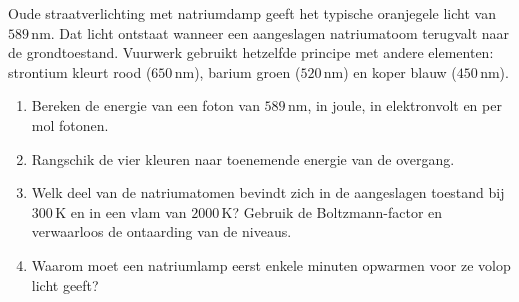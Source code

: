 \begin{oefening}
Oude straatverlichting met natriumdamp geeft het typische oranjegele licht van \(589\,\mathrm{nm}\). Dat licht ontstaat wanneer een aangeslagen natriumatoom terugvalt naar de grondtoestand. Vuurwerk gebruikt hetzelfde principe met andere elementen: strontium kleurt rood (\(650\,\mathrm{nm}\)), barium groen (\(520\,\mathrm{nm}\)) en koper blauw (\(450\,\mathrm{nm}\)).

\begin{enumerate}
\item[(a)]
  Bereken de energie van een foton van \(589\,\mathrm{nm}\), in joule, in elektronvolt en per mol fotonen.
\item[(b)]
  Rangschik de vier kleuren naar toenemende energie van de overgang.
\item[(c)]
  Welk deel van de natriumatomen bevindt zich in de aangeslagen toestand bij \(300\,\mathrm{K}\) en in een vlam van \(2000\,\mathrm{K}\)? Gebruik de Boltzmann-factor en verwaarloos de ontaarding van de niveaus.
\item[(d)]
  Waarom moet een natriumlamp eerst enkele minuten opwarmen voor ze volop licht geeft?
\end{enumerate}
\end{oefening}
